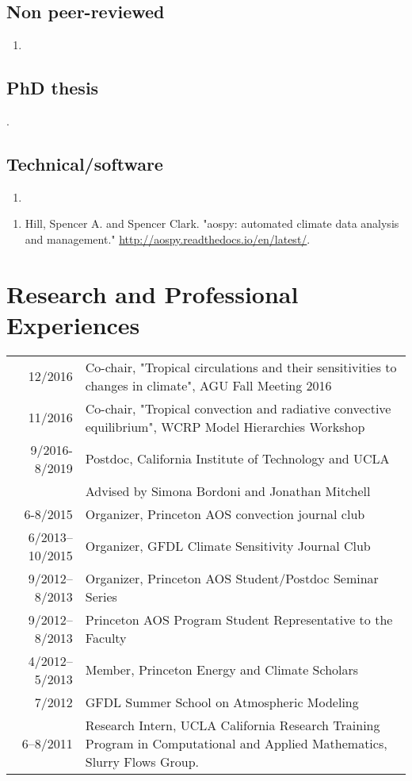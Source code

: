 \documentclass[12pt,letterpaper]{article}
\begin{document}
\subsection*{Non peer-reviewed}
\label{sec:orga1c8068}
\begin{enumerate}
\item {}
\end{enumerate}
\subsection*{PhD thesis}
\label{sec:org975bd28}
.
\subsection*{Technical/software}
\label{sec:org93a26b7}
\begin{enumerate}
\item {}
\end{enumerate}

\begin{enumerate}
\item Hill, Spencer A. and Spencer Clark.  "aospy: automated climate data analysis
and management."  \url{http://aospy.readthedocs.io/en/latest/}.
\end{enumerate}

\section*{Research and Professional Experiences}
\label{sec:org285d44f}
\begin{center}
\begin{tabularx}{\textwidth}{rX}
12/2016 & Co-chair, "Tropical circulations and their sensitivities to changes in climate", AGU Fall Meeting 2016\\
11/2016 & Co-chair, "Tropical convection and radiative convective equilibrium", WCRP Model Hierarchies Workshop\\
9/2016-8/2019 & Postdoc, California Institute of Technology and UCLA\\
 & Advised by Simona Bordoni and Jonathan Mitchell\\
6-8/2015 & Organizer, Princeton AOS convection journal club\\
6/2013–10/2015 & Organizer, GFDL Climate Sensitivity Journal Club\\
9/2012–8/2013 & Organizer, Princeton AOS Student/Postdoc Seminar Series\\
9/2012–8/2013 & Princeton AOS Program Student Representative to the Faculty\\
4/2012–5/2013 & Member, Princeton Energy and Climate Scholars\\
7/2012 & GFDL Summer School on Atmospheric Modeling\\
6–8/2011 & Research Intern, UCLA California Research Training Program in Computational and Applied Mathematics, Slurry Flows Group.\\
\end{tabularx}
\end{center}
\end{document}
